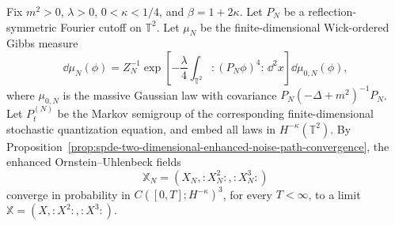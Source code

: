 \begin{hypothesis}
\label{hyp:phi-four-two-spde-assembly-inputs}
Fix \(m^2>0\), \(\lambda>0\), \(0<\kappa<1/4\), and
\(\beta=1+2\kappa\).  Let \(P_N\) be a reflection-symmetric Fourier cutoff
on \(\mathbb T^2\).  Let \(\mu_N\) be the finite-dimensional Wick-ordered
Gibbs measure
\[
  \dd\mu_N(\phi)
  =
  Z_N^{-1}
  \exp\!\left[
    -\frac{\lambda}{4}\int_{\mathbb T^2}:\!(P_N\phi)^4\!:\,\dd^2x
  \right]\dd\mu_{0,N}(\phi),
\]
where \(\mu_{0,N}\) is the massive Gaussian law with covariance
\(P_N(-\Delta+m^2)^{-1}P_N\).  Let \(P_t^{(N)}\) be the Markov semigroup of
the corresponding finite-dimensional stochastic quantization equation, and
embed all laws in \(H^{-\kappa}(\mathbb T^2)\).  By
Proposition~\ref{prop:spde-two-dimensional-enhanced-noise-path-convergence},
the enhanced Ornstein--Uhlenbeck fields
\[
  \mathbb X_N=(X_N,:\!X_N^2\!:,:\!X_N^3\!:)
\]
converge in probability in \(C([0,T];H^{-\kappa})^3\), for every
\(T<\infty\), to a limit
\(\mathbb X=(X,:\!X^2\!:,:\!X^3\!:)\).


\end{hypothesis}
